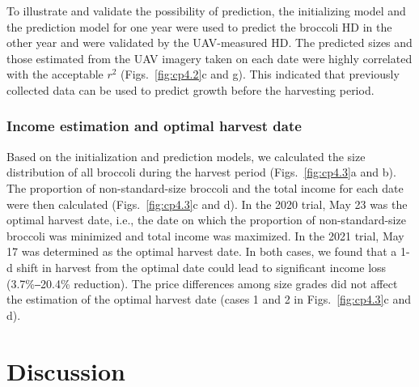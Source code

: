 

To illustrate and validate the possibility of prediction, the initializing model and the prediction model for one year were used to predict the broccoli HD in the other year and were validated by the UAV-measured HD. The predicted sizes and those estimated from the UAV imagery taken on each date were highly correlated with the acceptable $r^2$ (Figs.~\ref{fig:cp4.2}c and g). This indicated that previously collected data can be used to predict growth before the harvesting period.

\subsubsection*{Income estimation and optimal harvest date}

Based on the initialization and prediction models, we calculated the size distribution of all broccoli during the harvest period (Figs.~\ref{fig:cp4.3}a and b). The proportion of non-standard-size broccoli and the total income for each date were then calculated (Figs.~\ref{fig:cp4.3}c and d). In the 2020 trial, May 23 was the optimal harvest date, i.e., the date on which the proportion of non-standard-size broccoli was minimized and total income was maximized. In the 2021 trial, May 17 was determined as the optimal harvest date. In both cases, we found that a 1-d shift in harvest from the optimal date could lead to significant income loss (3.7\%‒20.4\% reduction). The price differences among size grades did not affect the estimation of the optimal harvest date (cases 1 and 2 in Figs.~\ref{fig:cp4.3}c and d).




\section{Discussion}

